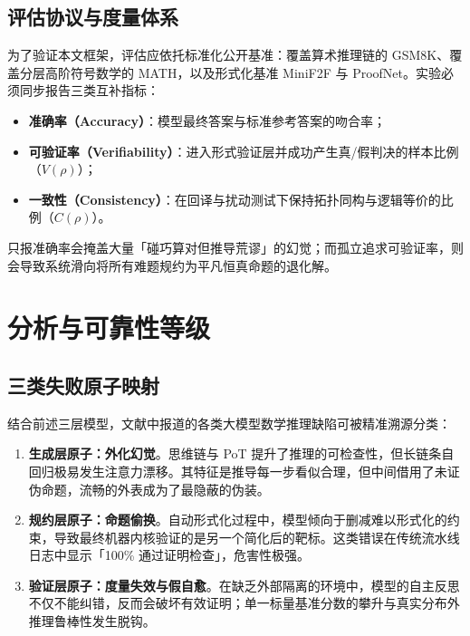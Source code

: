 ﻿\documentclass[UTF8,a4paper,11pt]{ctexart}
\theoremstyle{definition}
\begin{document}
\subsection{评估协议与度量体系}
为了验证本文框架，评估应依托标准化公开基准：覆盖算术推理链的 GSM8K\cite{cobbe2021gsm8k}、覆盖分层高阶符号数学的 MATH\cite{hendrycks2021math}，以及形式化基准 MiniF2F\cite{zheng2021minif2f} 与 ProofNet\cite{azerbayev2023proofnet}。实验必须同步报告三类互补指标：
\begin{itemize}[leftmargin=1.5em,itemsep=1pt]
  \item \textbf{准确率（Accuracy）}：模型最终答案与标准参考答案的吻合率；
  \item \textbf{可验证率（Verifiability）}：进入形式验证层并成功产生真/假判决的样本比例（$V(\rho)$）；
  \item \textbf{一致性（Consistency）}：在回译与扰动测试下保持拓扑同构与逻辑等价的比例（$C(\rho)$）。
\end{itemize}
只报准确率会掩盖大量「碰巧算对但推导荒谬」的幻觉；而孤立追求可验证率，则会导致系统滑向将所有难题规约为平凡恒真命题的退化解。

\section{分析与可靠性等级}
\label{sec:analysis}

\subsection{三类失败原子映射}
结合前述三层模型，文献中报道的各类大模型数学推理缺陷可被精准溯源分类：
\begin{enumerate}[leftmargin=1.8em,itemsep=2pt]
  \item \textbf{生成层原子：外化幻觉}。思维链与 PoT 提升了推理的可检查性，但长链条自回归极易发生注意力漂移\cite{wei2022cot,gao2022pal}。其特征是推导每一步看似合理，但中间借用了未证伪命题，流畅的外表成为了最隐蔽的伪装。
  \item \textbf{规约层原子：命题偷换}。自动形式化过程中，模型倾向于删减难以形式化的约束，导致最终机器内核验证的是另一个简化后的靶标\cite{wu2022auto,xin2024deepseekprover}。这类错误在传统流水线日志中显示「100\% 通过证明检查」，危害性极强。
  \item \textbf{验证层原子：度量失效与假自愈}。在缺乏外部隔离的环境中，模型的自主反思不仅不能纠错，反而会破坏有效证明\cite{huang2023selfcorrect,stechly2024selfverif}；单一标量基准分数的攀升与真实分布外推理鲁棒性发生脱钩\cite{chollet2019}。
\end{enumerate}
\end{document}
